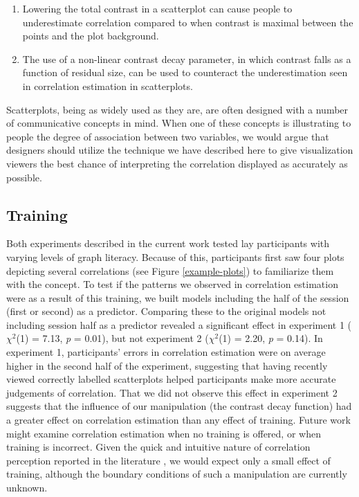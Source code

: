 \documentclass[preprint, 3p,
authoryear]{elsarticle} %
\begin{document}
\begin{enumerate}
\def\labelenumi{\arabic{enumi}.}
\item
  Lowering the total contrast in a scatterplot can cause people to
  underestimate correlation compared to when contrast is maximal between
  the points and the plot background.
\item
  The use of a non-linear contrast decay parameter, in which contrast
  falls as a function of residual size, can be used to counteract the
  underestimation seen in correlation estimation in scatterplots.
\end{enumerate}

Scatterplots, being as widely used as they are, are often designed with
a number of communicative concepts in mind. When one of these concepts
is illustrating to people the degree of association between two
variables, we would argue that designers should utilize the technique we
have described here to give visualization viewers the best chance of
interpreting the correlation displayed as accurately as possible.

\hypertarget{training}{%
\subsection{Training}\label{training}}

Both experiments described in the current work tested lay participants
with varying levels of graph literacy. Because of this, participants
first saw four plots depicting several correlations (see Figure
\ref{example-plots}) to familiarize them with the concept. To test if
the patterns we observed in correlation estimation were as a result of
this training, we built models including the half of the session (first
or second) as a predictor. Comparing these to the original models not
including session half as a predictor revealed a significant effect in
experiment 1 (\(\chi^2\)(1) = 7.13, \emph{p} = 0.01), but not experiment
2 (\(\chi^2\)(1) = 2.20, \emph{p} = 0.14). In experiment 1,
participants' errors in correlation estimation were on average higher in
the second half of the experiment, suggesting that having recently
viewed correctly labelled scatterplots helped participants make more
accurate judgements of correlation. That we did not observe this effect
in experiment 2 suggests that the influence of our manipulation (the
contrast decay function) had a greater effect on correlation estimation
than any effect of training. Future work might examine correlation
estimation when no training is offered, or when training is incorrect.
Given the quick and intuitive nature of correlation perception reported
in the literature \citep{rensink_2014}, we would expect only a small
effect of training, although the boundary conditions of such a
manipulation are currently unknown.
\end{document}
